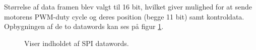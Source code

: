 Størrelse af data framen blev valgt til 16 bit, hvilket giver mulighed for at sende
motorens PWM-duty cycle og deres position (begge 11 bit) samt kontroldata.
Opbygningen af de to datawords kan ses på figur \ref{fig:protokol1}.

\begin{figure}[h!]
\centering
{}
\qquad
{}
\caption[Indholdet af SPI datawords]{Viser indholdet af SPI datawords. }
\label{fig:protokol1}
\end{figure}

